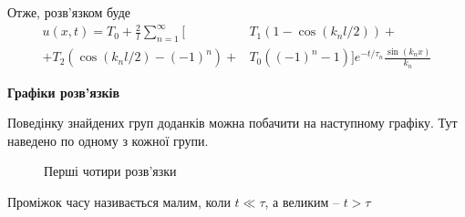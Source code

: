 Отже, розв'язком буде
\begin{equation}
    \begin{aligned}
        u(x,t) = T_0 + \frac{2}{l}\sum_{n=1}^{\infty}\big[&T_1(1 - \cos(k_n l/2)) +\\
        + T_2(\cos(k_n l/2) - (-1)^n) + &T_0 ((-1)^n - 1)\big] e^{-t/\tau_n} \frac{\sin(k_n x)}{k_n}
    \end{aligned}
\end{equation}

\begin{center}
    \textbf{Графіки розв'язків}
\end{center}

Поведінку знайдених груп доданків можна побачити на наступному графіку. Тут наведено по одному з кожної групи. %
\begin{figure}[h]
    \centering
\caption{Перші чотири розв'язки}
\end{figure}

Проміжок часу називається малим, коли $t \ll \tau$, а великим -- $t > \tau$

%